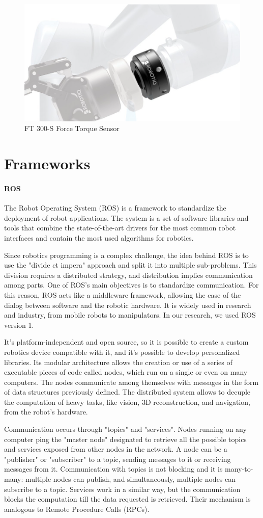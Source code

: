 \begin{figure}
	\centering
	\includegraphics[width=0.5\linewidth]{Images/ft_sensor.png}
	\caption{FT 300-S Force Torque Sensor}
	\label{fig:ft-sensor}
\end{figure}


\section{Frameworks}
\paragraph{ROS}
The Robot Operating System (ROS) \cite{url:ros} is a framework to standardize the deployment of robot applications. The system is a set of software libraries and tools that combine the state-of-the-art drivers for the most common robot interfaces and contain the most used algorithms for robotics. 

Since robotics programming is a complex challenge, the idea behind ROS is to use the "divide et impera" approach and split it into multiple sub-problems. This division requires a distributed strategy, and distribution implies communication among parts. One of ROS's main objectives is to standardize communication. For this reason, ROS acts like a middleware framework, allowing the ease of the dialog between software and the robotic hardware. It is widely used in research and industry, from mobile robots to manipulators. In our research, we used ROS version 1. 

It's platform-independent and open source, so it is possible to create a custom robotics device compatible with it, and it's possible to develop personalized libraries. Its modular architecture allows the creation or use of a series of executable pieces of code called nodes, which run on a single or even on many computers. The nodes communicate among themselves with messages in the form of data structures previously defined. The distributed system allows to decuple the computation of heavy tasks, like vision, 3D reconstruction, and navigation, from the robot's hardware. 

Communication occurs through "topics" and "services". Nodes running on any computer ping the "master node" designated to retrieve all the possible topics and services exposed from other nodes in the network. A node can be a "publisher" or "subscriber" to a topic, sending messages to it or receiving messages from it. Communication with topics is not blocking and it is many-to-many: multiple nodes can publish, and simultaneously, multiple nodes can subscribe to a topic. Services work in a similar way, but the communication blocks the computation till the data requested is retrieved. Their mechanism is analogous to Remote Procedure Calls (RPCs). 

